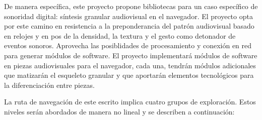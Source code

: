 De manera específica, este proyecto propone bibliotecas para un caso específico de sonoridad digital: síntesis granular audiovisual en el navegador. El proyecto opta por este camino en resistencia a la preponderancia del patrón audiovisual basado en relojes y en pos de la densidad, la textura y el gesto como detonador de eventos sonoros. Aprovecha las posiblidades de procesamiento y conexión en red para generar módulos de software. El proyecto implementará módulos de software en piezas audiovisuales para el navegador, cada una, tendrán módulos adicionales que matizarán el esqueleto granular y que aportarán elementos tecnológicos para la diferenciación entre piezas.

La ruta de navegación de este escrito implica cuatro grupos de exploración. Estos niveles serán abordados de manera no lineal y se describen a continuación:  

